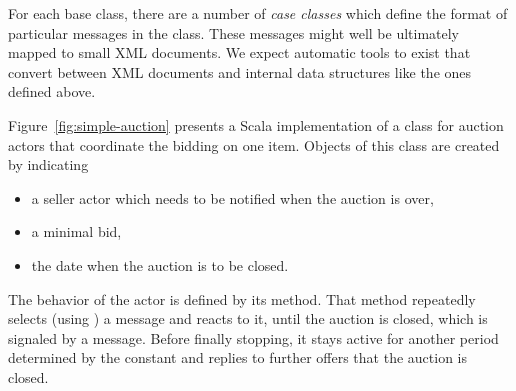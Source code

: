 For each base class, there are a number of {\em case classes} which
define the format of particular messages in the class. These messages
might well be ultimately mapped to small XML documents. We expect
automatic tools to exist that convert between XML documents and
internal data structures like the ones defined above.

Figure~\ref{fig:simple-auction} presents a Scala implementation of a
class  for auction actors that coordinate the bidding
on one item. Objects of this class are created by indicating
\begin{itemize}
\item a seller actor which needs to be notified when the auction is over,
\item a minimal bid,
\item the date when the auction is to be closed.
\end{itemize}
The behavior of the actor is defined by its  method. That method
repeatedly selects (using ) a message and reacts to it,
until the auction is closed, which is signaled by a 
message. Before finally stopping, it stays active for another period
determined by the  constant and replies to
further offers that the auction is closed.

